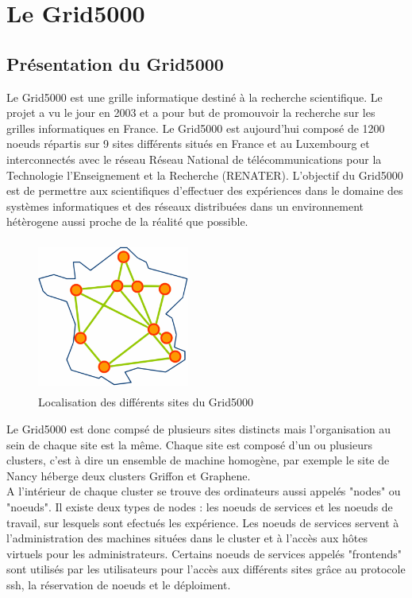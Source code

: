 \documentclass [10pt,a4paper]{report}
\begin{document}
\part{Le Grid5000}
	\chapter{Présentation du Grid5000}
Le Grid5000 est une grille informatique destiné à la recherche scientifique. Le projet a vu le jour en 2003 et a pour but de promouvoir la recherche sur les grilles informatiques en France. Le Grid5000 est aujourd'hui composé de 1200 noeuds répartis sur 9 sites différents situés en France et au Luxembourg et interconnectés avec le réseau Réseau National de télécommunications pour la Technologie l'Enseignement et la Recherche (RENATER). L'objectif du Grid5000 est de permettre aux scientifiques d'effectuer des expériences dans le domaine des systèmes informatiques et des réseaux distribuées dans un environnement hétèrogene aussi proche de la réalité que possible.

	\begin{figure}[!h]
		\centering
   		\includegraphics[width=5cm,height=5cm]{map.png}
   		\caption{Localisation des différents sites du Grid5000}
    	\label{fig:map}
	\end{figure} 

Le Grid5000 est donc compsé de plusieurs sites distincts mais l'organisation au sein de chaque site est la même. Chaque site est composé d'un ou plusieurs clusters, c'est à dire un ensemble de machine homogène, par exemple le site de Nancy héberge deux clusters Griffon et Graphene. \\
A l'intérieur de chaque cluster se trouve des ordinateurs aussi appelés "nodes" ou "noeuds". Il existe deux types de nodes : les noeuds de services et les noeuds de travail, sur lesquels sont efectués les expérience. Les noeuds de services servent à l'administration des machines situées dans le cluster et à l'accès aux hôtes virtuels pour les administrateurs. Certains noeuds de services appelés "frontends" sont utilisés par les utilisateurs pour l'accès aux différents sites grâce au protocole ssh, la réservation de noeuds et le déploiment. 
\end{document}
